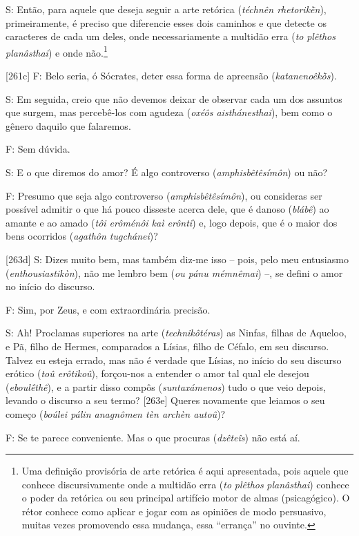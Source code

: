 S: Então, para aquele que deseja seguir a arte retórica (\emph{téchnên
rhetorikḕn}), primeiramente, é preciso que diferencie esses dois
caminhos e que detecte os caracteres de cada um deles, onde
necessariamente a multidão erra (\emph{to} \emph{plêthos}
\emph{planâsthai}) e onde não.\footnote{Uma definição provisória de arte
  retórica é aqui apresentada, pois aquele que conhece discursivamente
  onde a multidão erra (\emph{to} \emph{plêthos} \emph{planâsthai})
  conhece o poder da retórica ou seu principal artifício motor de almas
  (psicagógico). O rétor conhece como aplicar e jogar com as opiniões de
  modo persuasivo, muitas vezes promovendo essa mudança, essa
  ``errança'' no ouvinte.}

{[}261c{]} F: Belo seria, ó Sócrates, deter essa forma de apreensão
(\emph{katanenoêkṑs}).

S: Em seguida, creio que não devemos deixar de observar cada um dos
assuntos que surgem, mas percebê-los com agudeza (\emph{oxéôs
aisthánesthai}), bem como o gênero daquilo que falaremos.

F: Sem dúvida.

S: E o que diremos do amor? É algo controverso (\emph{amphisbêtêsímôn})
ou não?

F: Presumo que seja algo controverso (\emph{amphisbêtêsímôn}), ou
consideras ser possível admitir o que há pouco disseste acerca dele, que
é danoso (\emph{blábê}) ao amante e ao amado (\emph{tôi erôménôi kaì
erônti}) e, logo depois, que é o maior dos bens ocorridos (\emph{agathôn
tugchánei})?

{[}263d{]} S: Dizes muito bem, mas também diz-me isso -- pois, pelo meu
entusiasmo (\emph{enthousiastikòn}), não me lembro bem (\emph{ou pánu
mémnêmai}) --, se defini o amor no início do discurso.

F: Sim, por Zeus, e com extraordinária precisão.

S: Ah! Proclamas superiores na arte (\emph{technikôtéras}) as Ninfas,
filhas de Aqueloo, e Pã, filho de Hermes, comparados a Lísias, filho de
Céfalo, em seu discurso. Talvez eu esteja errado, mas não é verdade que
Lísias, no início do seu discurso erótico (\emph{toû erôtikoû}),
forçou-nos a entender o amor tal qual ele desejou (\emph{eboulḗthê}), e
a partir disso compôs (\emph{suntaxámenos}) tudo o que veio depois,
levando o discurso a seu termo? {[}263e{]} Queres novamente que leiamos
o seu começo (\emph{boúlei pálin anagnômen tèn archèn autoû})?

F: Se te parece conveniente. Mas o que procuras (\emph{dzêteîs}) não
está aí.

